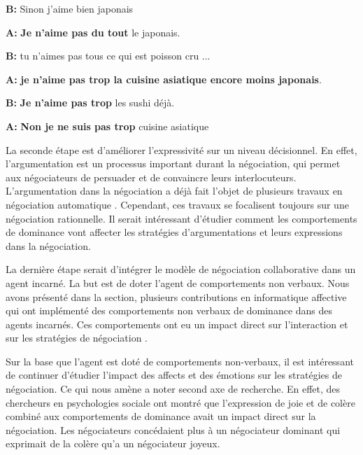 	\begin{minipage}{\textwidth}
		{\ttfamily

			\begin{addmargin}[1em]{2em}%
				
				\vspace{0.5em}
			
				
					 \hspace*{3mm} \textbf{B:}  Sinon j'aime bien japonais 
				
				
					\textbf{A:} \textbf{Je n'aime pas du tout} le japonais.
				
					\hspace*{3mm} 	\textbf{B:} tu n'aimes pas tous ce qui est poisson cru ... 
				
					\textbf{A:}  \textbf{je n'aime pas trop la cuisine asiatique encore moins japonais}.
					
					\hspace*{3mm} 	\textbf{B:} \textbf{Je n'aime pas trop }les sushi déjà.
					
					\textbf{A:} \textbf{Non je ne suis pas trop} cuisine asiatique
			\end{addmargin}
		} 
	\end{minipage}

	La seconde étape est d'améliorer l'expressivité sur un niveau décisionnel. En effet, l'argumentation est un processus important durant la négociation, qui permet aux négociateurs de persuader et de convaincre leurs interlocuteurs. L'argumentation dans la négociation a déjà fait l'objet de plusieurs travaux en négociation automatique \cite{toni2010argumentative,oliva2010argumentation}. Cependant, ces travaux se focalisent toujours sur une négociation rationnelle. Il serait intéressant d'étudier comment les comportements de dominance vont affecter les stratégies d'argumentations et leurs expressions dans la négociation.
	
	La dernière étape serait d'intégrer le modèle de négociation collaborative dans un agent incarné. La but est de doter l'agent de comportements non verbaux. Nous avons présenté dans la section, plusieurs contributions en informatique affective qui ont implémenté des comportements non verbaux de dominance dans des agents incarnés. Ces comportements ont eu un impact direct sur l'interaction et sur les stratégies de négociation \cite{de2011effect,de2015humans}. 
	
	Sur la base que l'agent est doté de comportements non-verbaux, il est intéressant de continuer d'étudier l'impact des affects et des émotions sur les stratégies de négociation. Ce qui nous amène a noter second axe de recherche. En effet, des chercheurs en psychologies sociale \cite{van2006power} ont montré que l'expression de joie et de colère combiné aux comportements de dominance avait un impact direct sur la négociation. Les négociateurs concédaient plus à un négociateur dominant qui exprimait de la colère qu'a un négociateur joyeux. 
	
	 
	
	
	